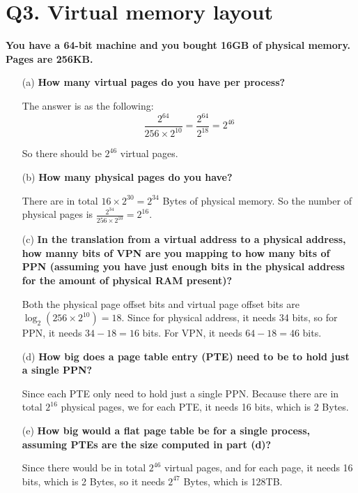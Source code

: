 \documentclass{article}
\theoremstyle{remark}
\theoremstyle{definition}
\begin{document}
    \section{Q3. Virtual memory layout}
    \textbf{You have a 64-bit machine and you bought 16GB of physical memory. Pages are 256KB.}
    \begin{enumerate}
        \item[(a)] \textbf{How many virtual pages do you have per process?}

        The answer is as the following:
        \begin{equation*}
            \frac{2^{64}}{256\times 2^{10}} = \frac{2^{64}}{2^{18}} = 2^{46}
        \end{equation*}

        So there should be $2^{46}$ virtual pages.

        \item[(b)] \textbf{How many physical pages do you have?}

        There are in total $16\times 2^{30} = 2^{34}$ Bytes of physical memory. So the number of physical pages is $\frac{2^{34}}{256\times 2^{10}} = 2^{16}$.

        \item[(c)] \textbf{In the translation from a virtual address to a physical address, how manny bits of VPN are you mapping to how many bits of PPN (assuming you have just enough bits in the physical address for the amount of physical RAM present)?}

        Both the physical page offset bits and virtual page offset bits are $\log_2 \left( 256\times 2^{10} \right) = 18$. Since for physical address, it needs 34 bits, so for PPN, it needs $34 - 18 = 16$ bits. For VPN, it needs $64 - 18 = 46$ bits.

        \item[(d)] \textbf{How big does a page table entry (PTE) need to be to hold just a single PPN?}

        Since each PTE only need to hold just a single PPN. Because there are in total $2^{16}$ physical pages, we for each PTE, it needs 16 bits, which is 2 Bytes.

        \item[(e)] \textbf{How big would a flat page table be for a single process, assuming PTEs are the size computed in part (d)?}

        Since there would be in total $2^{46}$ virtual pages, and for each page, it needs 16 bits, which is 2 Bytes, so it needs $2^{47}$ Bytes, which is 128TB.


\end{enumerate}
\end{document}
